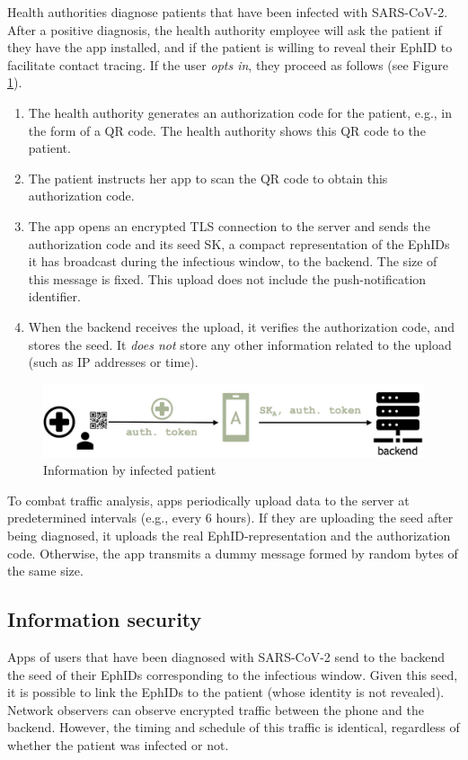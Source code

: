 \documentclass[12pt,a4paper]{article}
\begin{document}
Health authorities diagnose patients that have been infected with SARS-CoV-2. After a
positive diagnosis, the health authority employee will ask the patient if they have the app installed, and if the patient is willing to reveal their EphID to facilitate contact tracing. If the user \textit{opts in},  they proceed as follows (see Figure \ref{infected}).
\begin{enumerate}\itemsep0pt
\item The health authority generates an authorization code for the patient, e.g., in the form of a QR code. The health authority shows this QR code to the patient.
\item The patient instructs her app to scan the QR code to obtain this authorization code.
\item The app opens an encrypted TLS connection to the server and sends the
authorization code and its seed SK, a compact representation of the EphIDs it has
broadcast during the infectious window, to the backend. The size of this message is
fixed. This upload does not  include the push-notification identifier.
\item When the backend receives the upload, it verifies the authorization code, and stores
the seed. It \textit{does not} store any other information related to the upload (such as IP addresses or time).
\end{enumerate}
\begin{figure}[H]
\centering
\includegraphics[scale=0.5]{fig/infected}
\caption{Information by infected patient}
\label{infected}
\end{figure}
To combat traffic analysis, apps periodically upload data to the server at predetermined
intervals (e.g., every 6 hours). If they are uploading the seed after being diagnosed, it
uploads the real EphID-representation and the authorization code. Otherwise, the app
transmits a dummy message formed by random bytes of the same size.
\subsection*{Information security}
Apps of users that have been diagnosed with SARS-CoV-2 send to the backend the seed of
their EphIDs corresponding to the infectious window. Given this seed, it is possible to link the EphIDs to the patient (whose identity is not revealed).\\[0.2cm]
Network observers can observe encrypted traffic between the phone and the backend.
However, the timing and schedule of this traffic is identical, regardless of whether the patient was infected or not.
\end{document}
